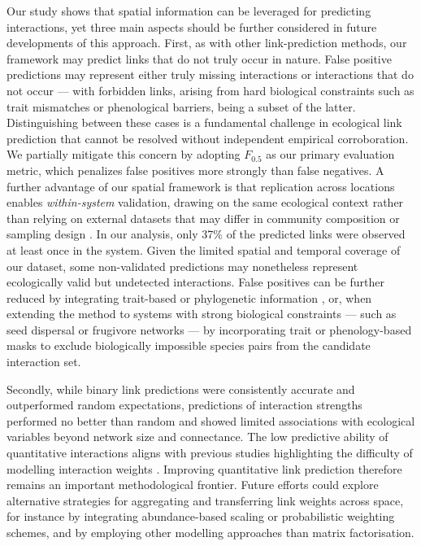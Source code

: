 \documentclass[oneside, a4paper, onecolumn, 11pt]{article}
\newcommand{\revtag}[1]{\textcolor{softcoral}{[#1]}}
\begin{document}
Our study shows that spatial information can be leveraged for predicting interactions, yet three main aspects should be further considered in future developments of this approach. First, as with other link-prediction methods, our framework may predict links that do not truly occur in nature. False positive predictions may represent either truly missing interactions or interactions that do not occur — with forbidden links, arising from hard biological constraints such as trait mismatches or phenological barriers, being a subset of the latter. Distinguishing between these cases is a fundamental challenge in ecological link prediction that cannot be resolved without independent empirical corroboration. We partially mitigate this concern by adopting $F_{0.5}$ as our primary evaluation metric, which penalizes false positives more strongly than false negatives. A further advantage of our spatial framework is that replication across locations enables \textit{within-system} validation, drawing on the same ecological context rather than relying on external datasets that may differ in community composition or sampling design \citep{Stock2021-do,Farrell2022-ki}. In our analysis, only 37\% of the predicted links were observed at least once in the system. Given the limited spatial and temporal coverage of our dataset, some non-validated predictions may nonetheless represent ecologically valid but undetected interactions. False positives can be further reduced by integrating trait-based or phylogenetic information \citep{Peralta2024-xy}, or, when extending the method to systems with strong biological constraints — such as seed dispersal or frugivore networks — by incorporating trait or phenology-based masks to exclude biologically impossible species pairs from the candidate interaction set. %

Secondly, while binary link predictions were consistently accurate and outperformed random expectations, predictions of interaction strengths performed no better than random and showed limited associations with ecological variables beyond network size and connectance. The low predictive ability of quantitative interactions aligns with previous studies highlighting the difficulty of modelling interaction weights \citep{Terry2020-wv,Dormann2025-rz}. Improving quantitative link prediction therefore remains an important methodological frontier. Future efforts could explore alternative strategies for aggregating and transferring link weights across space, for instance by integrating abundance-based scaling or probabilistic weighting schemes, and by employing other modelling approaches than matrix factorisation.
\end{document}
